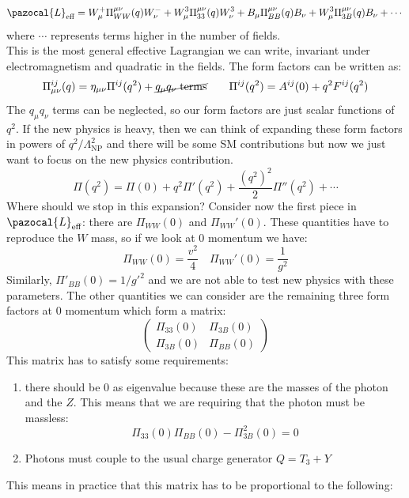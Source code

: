 \documentclass[../main.tex]{subfiles}
\begin{document}
\[
\pazocal{L}_{\text{eff}}=W_\mu^+\Pi_{WW}^{\mu\nu}(q)W_\nu^-+W_\mu^3\Pi_{33}^{\mu\nu}(q)W_\nu^3+B_\mu\Pi_{BB}^{\mu\nu}(q)B_\nu+W_\mu^3\Pi_{3B}^{\mu\nu}(q)B_\nu+\cdots
\]
where $\cdots$ represents terms higher in the number of fields.\\
This is the most general effective Lagrangian we can write, invariant under electromagnetism and quadratic in the fields. The form factors can be written as:
\[
\Pi_{\mu\nu}^{ij}(q)=\eta_{\mu\nu}\Pi^{ij}(q^2)+\cancel{q_\mu q_\nu\;\text{terms}} \qquad \Pi^{ij}(q^2)=A^{ij}(0)+q^2F^{ij}(q^2)
\]
The $q_\mu q_\nu$ terms can be neglected, so our form factors are just scalar functions of $q^2$. If the new physics is heavy, then we can think of expanding these form factors in powers of $q^2/\Lambda_{\text{NP}}^2$ and there will be some SM contributions but now we just want to focus on the new physics contribution. 
\[
\Pi(q^2)=\Pi(0)+q^2\Pi'(q^2)+\frac{(q^2)^2}{2}\Pi''(q^2)+\cdots
\]
Where should we stop in this expansion? Consider now the first piece in $\pazocal{L}_{\text{eff}}$: there are $\Pi_{WW}(0)$ and $\Pi_{WW}'(0)$. These quantities have to reproduce the $W$ mass, so if we look at 0 momentum we have:
\[
\Pi_{WW}(0)=\frac{v^2}{4} \quad \Pi_{WW}'(0)=\frac{1}{g^2}
\]
Similarly, $\Pi'_{BB}(0)=1/g'^2$ and we are not able to test new physics with these parameters. The other quantities we can consider are the remaining three form factors at 0 momentum which form a matrix:
\[
\left(\begin{array}{cc}
    \Pi_{33}(0) & \Pi_{3B}(0) \\
    \Pi_{3B}(0) & \Pi_{BB}(0) 
\end{array}\right)
\]
This matrix has to satisfy some requirements:
\begin{enumerate}[label=\roman*)]
    \item there should be 0 as eigenvalue because these are the masses of the photon and the $Z$. This means that we are requiring that the photon must be massless:
    \[
    \Pi_{33}(0)\Pi_{BB}(0)-\Pi_{3B}^2(0)=0
    \]
    \item Photons must couple to the usual charge generator $Q=T_3+Y$
\end{enumerate}
This means in practice that this matrix has to be proportional to the following:
\end{document}
